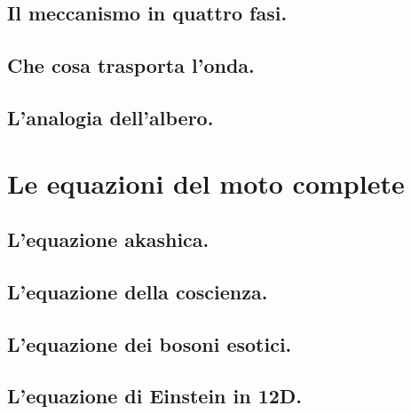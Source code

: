 \subsection{Il meccanismo in quattro fasi.}
\subsection{Che cosa trasporta l'onda.}
\subsection{L'analogia dell'albero.}

\section{Le equazioni del moto complete}
\subsection{L'equazione akashica.}
\subsection{L'equazione della coscienza.}
\subsection{L'equazione dei bosoni esotici.}
\subsection{L'equazione di Einstein in 12D.}

\newpage
